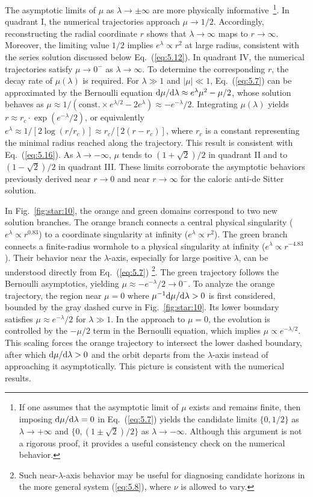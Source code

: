 \documentclass[aps,prd,twocolumn]{revtex4-2}
\newcommand\dx{{\rm d}}
\begin{document}
The asymptotic limits of $\mu$ as $\lambda\rightarrow\pm\infty$ are more physically informative~\footnote{If one assumes that the asymptotic limit of $\mu$ exists and remains finite, then imposing $\dx\mu/\dx\lambda=0$ in Eq.~(\ref{eq:5.7}) yields the candidate limits $\{0,1/2\}$ as $\lambda\rightarrow+\infty$ and $\{0,(1\pm\sqrt{2})/2\}$ as $\lambda\rightarrow-\infty$. Although this argument is not a rigorous proof, it provides a useful consistency check on the numerical behavior.}. In quadrant I, the numerical trajectories approach $\mu\rightarrow1/2$. Accordingly, reconstructing the radial coordinate $r$ shows that $\lambda\rightarrow\infty$ maps to $r\rightarrow\infty$. Moreover, the limiting value $1/2$ implies $e^\lambda\propto r^2$ at large radius, consistent with the series solution discussed below Eq.~(\ref{eq:5.12}). In quadrant IV, the numerical trajectories satisfy $\mu\rightarrow0^{-}$ as $\lambda\rightarrow\infty$. To determine the corresponding $r$, the decay rate of $\mu(\lambda)$ is required. For $\lambda\gg1$ and $|\mu|\ll1$, Eq.~(\ref{eq:5.7}) can be approximated by the Bernoulli equation $\dx\mu/\dx\lambda \approx e^\lambda\mu^2-\mu/2$, whose solution behaves as $\mu\approx1/(\mathrm{const.}\times e^{\lambda/2}-2e^\lambda)\approx -e^{-\lambda}/2$. Integrating $\mu(\lambda)$ yields $r\approx r_c\cdot\exp(e^{-\lambda}/2)$, or equivalently $e^\lambda\approx1/[2\log(r/r_c)]\approx r_c/[2(r-r_c)]$, where $r_c$ is a constant representing the minimal radius reached along the trajectory. This result is consistent with Eq.~(\ref{eq:5.16}). As $\lambda\rightarrow-\infty$, $\mu$ tends to $(1+\sqrt{2})/2$ in quadrant II and to $(1-\sqrt{2})/2$ in quadrant III. These limits corroborate the asymptotic behaviors previously derived near $r\rightarrow0$ and near $r\rightarrow\infty$ for the caloric anti-de Sitter solution.

In Fig.~\ref{fig:star:10}, the orange and green domains correspond to two new solution branches. The orange branch connects a central physical singularity ($e^\lambda\propto r^{0.83}$) to a coordinate singularity at infinity ($e^\lambda\propto r^2$). The green branch connects a finite-radius wormhole to a physical singularity at infinity ($e^\lambda\propto r^{-4.83}$). Their behavior near the $\lambda$-axis, especially for large positive $\lambda$, can be understood directly from Eq.~(\ref{eq:5.7}) \footnote{Such near-$\lambda$-axis behavior may be useful for diagnosing candidate horizons in the more general system (\ref{eq:5.8}), where $\nu$ is allowed to vary.}. The green trajectory follows the Bernoulli asymptotics, yielding $\mu\approx-e^{-\lambda}/2\rightarrow0^{-}$. To analyze the orange trajectory, the region near $\mu=0$ where $\mu^{-1}\dx\mu/\dx\lambda>0$ is first considered, bounded by the gray dashed curve in Fig.~\ref{fig:star:10}. Its lower boundary satisfies $\mu\approx e^{-\lambda}/2$ for $\lambda\gg1$. In the approach to $\mu=0$, the evolution is controlled by the $-\mu/2$ term in the Bernoulli equation, which implies $\mu\propto e^{-\lambda/2}$. This scaling forces the orange trajectory to intersect the lower dashed boundary, after which $\dx\mu/\dx\lambda>0$ and the orbit departs from the $\lambda$-axis instead of approaching it asymptotically. This picture is consistent with the numerical results.
\end{document}
